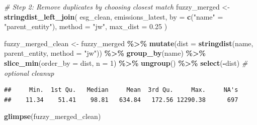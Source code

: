 \documentclass[
]{article}
\newenvironment{Shaded}{\begin{snugshade}}{\end{snugshade}}
\newcommand{\AttributeTok}[1]{\textcolor[rgb]{0.13,0.29,0.53}{#1}}
\newcommand{\CommentTok}[1]{\textcolor[rgb]{0.56,0.35,0.01}{\textit{#1}}}
\newcommand{\DecValTok}[1]{\textcolor[rgb]{0.00,0.00,0.81}{#1}}
\newcommand{\FloatTok}[1]{\textcolor[rgb]{0.00,0.00,0.81}{#1}}
\newcommand{\FunctionTok}[1]{\textcolor[rgb]{0.13,0.29,0.53}{\textbf{#1}}}
\newcommand{\NormalTok}[1]{#1}
\newcommand{\OtherTok}[1]{\textcolor[rgb]{0.56,0.35,0.01}{#1}}
\newcommand{\SpecialCharTok}[1]{\textcolor[rgb]{0.81,0.36,0.00}{\textbf{#1}}}
\newcommand{\StringTok}[1]{\textcolor[rgb]{0.31,0.60,0.02}{#1}}
\begin{document}
\begin{Shaded}
\begin{Highlighting}[]
\CommentTok{\# Step 2: Remove duplicates by choosing closest match}
\NormalTok{fuzzy\_merged }\OtherTok{\textless{}{-}} \FunctionTok{stringdist\_left\_join}\NormalTok{(}
\NormalTok{  esg\_clean,}
\NormalTok{  emissions\_latest,}
  \AttributeTok{by =} \FunctionTok{c}\NormalTok{(}\StringTok{"name"} \OtherTok{=} \StringTok{"parent\_entity"}\NormalTok{),}
  \AttributeTok{method =} \StringTok{"jw"}\NormalTok{,}
  \AttributeTok{max\_dist =} \FloatTok{0.25}
\NormalTok{)}

\NormalTok{fuzzy\_merged\_clean }\OtherTok{\textless{}{-}}\NormalTok{ fuzzy\_merged }\SpecialCharTok{\%\textgreater{}\%}
  \FunctionTok{mutate}\NormalTok{(}\AttributeTok{dist =} \FunctionTok{stringdist}\NormalTok{(name, parent\_entity, }\AttributeTok{method =} \StringTok{"jw"}\NormalTok{)) }\SpecialCharTok{\%\textgreater{}\%}
  \FunctionTok{group\_by}\NormalTok{(name) }\SpecialCharTok{\%\textgreater{}\%}
  \FunctionTok{slice\_min}\NormalTok{(}\AttributeTok{order\_by =}\NormalTok{ dist, }\AttributeTok{n =} \DecValTok{1}\NormalTok{) }\SpecialCharTok{\%\textgreater{}\%}
  \FunctionTok{ungroup}\NormalTok{() }\SpecialCharTok{\%\textgreater{}\%}
  \FunctionTok{select}\NormalTok{(}\SpecialCharTok{{-}}\NormalTok{dist)  }\CommentTok{\# optional cleanup}
\end{Highlighting}
\end{Shaded}

\begin{Shaded}
\end{Shaded}

\begin{verbatim}
##     Min.  1st Qu.   Median     Mean  3rd Qu.     Max.     NA's 
##    11.34    51.41    98.81   634.84   172.56 12290.38      697
\end{verbatim}

\begin{Shaded}
\begin{Highlighting}[]
\FunctionTok{glimpse}\NormalTok{(fuzzy\_merged\_clean)}
\end{Highlighting}
\end{Shaded}
\end{document}
